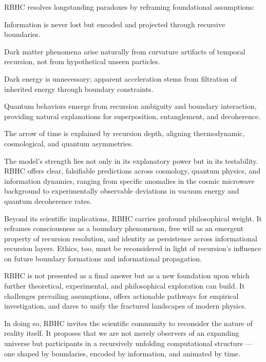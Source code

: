 \documentclass[11pt,a4paper]{article}
\begin{document}
RBHC resolves longstanding paradoxes by reframing foundational assumptions:

Information is never lost but encoded and projected through recursive boundaries.

Dark matter phenomena arise naturally from curvature artifacts of temporal recursion, not from hypothetical unseen particles.

Dark energy is unnecessary; apparent acceleration stems from filtration of inherited energy through boundary constraints.

Quantum behaviors emerge from recursion ambiguity and boundary interaction, providing natural explanations for superposition, entanglement, and decoherence.

The arrow of time is explained by recursion depth, aligning thermodynamic, cosmological, and quantum asymmetries.


The model’s strength lies not only in its explanatory power but in its testability. RBHC offers clear, falsifiable predictions across cosmology, quantum physics, and information dynamics, ranging from specific anomalies in the cosmic microwave background to experimentally observable deviations in vacuum energy and quantum decoherence rates.

Beyond its scientific implications, RBHC carries profound philosophical weight. It reframes consciousness as a boundary phenomenon, free will as an emergent property of recursion resolution, and identity as persistence across informational recursion layers. Ethics, too, must be reconsidered in light of recursion’s influence on future boundary formations and informational propagation.

RBHC is not presented as a final answer but as a new foundation upon which further theoretical, experimental, and philosophical exploration can build. It challenges prevailing assumptions, offers actionable pathways for empirical investigation, and dares to unify the fractured landscapes of modern physics.

In doing so, RBHC invites the scientific community to reconsider the nature of reality itself. It proposes that we are not merely observers of an expanding universe but participants in a recursively unfolding computational structure — one shaped by boundaries, encoded by information, and animated by time.



\end{document}
